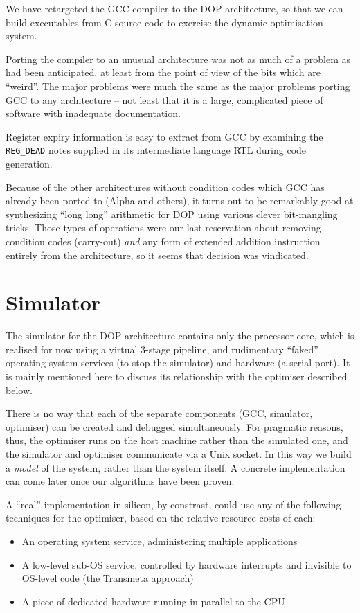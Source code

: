\documentclass[11pt,letterpaper,twocolumn,notitlepage]{article}
\begin{document}
We have retargeted the GCC compiler to the DOP architecture, so that we can build executables from C source code to exercise the dynamic optimisation system.

Porting the compiler to an unusual architecture was not as much of a problem as had been anticipated, at least from the point of view of the bits which are ``weird''. The major problems were much the same as the major problems porting GCC to any architecture -- not least that it is a large, complicated piece of software with inadequate documentation.

Register expiry information is easy to extract from GCC by examining the {\tt REG\_DEAD} notes supplied in its intermediate language RTL during code generation.

Because of the other architectures without condition codes which GCC has already been ported to (Alpha and others), it turns out to be remarkably good at synthesizing ``long long'' arithmetic for DOP using various clever bit-mangling tricks. Those types of operations were our last reservation about removing condition codes (carry-out) {\em and} any form of extended addition instruction entirely from the architecture, so it seems that decision was vindicated.

\section{Simulator}

The simulator for the DOP architecture contains only the processor core, which is realised for now using a virtual 3-stage pipeline, and rudimentary ``faked'' operating system services (to stop the simulator) and hardware (a serial port). It is mainly mentioned here to discuss its relationship with the optimiser described below.

There is no way that each of the separate components (GCC, simulator, optimiser) can be created and debugged simultaneously. For pragmatic reasons, thus, the optimiser runs on the host machine rather than the simulated one, and the simulator and optimiser communicate via a Unix socket. In this way we build a {\em model} of the system, rather than the system itself. A concrete implementation can come later once our algorithms have been proven.

A ``real'' implementation in silicon, by constrast, could use any of the following techniques for the optimiser, based on the relative resource costs of each:

\begin{itemize}
\item An operating system service, administering multiple applications
\item A low-level sub-OS service, controlled by hardware interrupts and invisible to OS-level code (the Transmeta approach)
\item A piece of dedicated hardware running in parallel to the CPU
\end{itemize}
\end{document}
